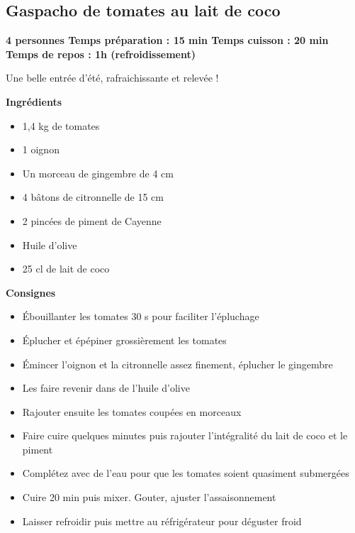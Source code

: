 \documentclass[]{book}
\providecommand{\tightlist}{%
  \setlength{\itemsep}{0pt}\setlength{\parskip}{0pt}}
\begin{document}
\subsection*{\texorpdfstring{{Gaspacho de tomates au lait de
coco}}{Gaspacho de tomates au lait de coco}}\label{gaspacho-de-tomates-au-lait-de-coco}

\begin{salebox}
\textbf{4 personnes \textbar{} Temps préparation : 15 min \textbar{}
Temps cuisson : 20 min \textbar{} Temps de repos : 1h (refroidissement)}

Une belle entrée d'été, rafraichissante et relevée !
\end{salebox}

 \textbf{Ingrédients}

\begin{itemize}
\tightlist
\item
  1,4 kg de tomates
\item
  1 oignon
\item
  Un morceau de gingembre de 4 cm
\item
  4 bâtons de citronnelle de 15 cm
\item
  2 pincées de piment de Cayenne
\item
  Huile d'olive
\item
  25 cl de lait de coco
\end{itemize}

\textbf{Consignes}

\begin{itemize}
\tightlist
\item
  Ébouillanter les tomates 30 s pour faciliter l'épluchage
\item
  Éplucher et épépiner grossièrement les tomates
\item
  Émincer l'oignon et la citronnelle assez finement, éplucher le
  gingembre
\item
  Les faire revenir dans de l'huile d'olive
\item
  Rajouter ensuite les tomates coupées en morceaux
\item
  Faire cuire quelques minutes puis rajouter l'intégralité du lait de
  coco et le piment
\item
  Complétez avec de l'eau pour que les tomates soient quasiment
  submergées
\item
  Cuire 20 min puis mixer. Gouter, ajuster l'assaisonnement
\item
  Laisser refroidir puis mettre au réfrigérateur pour déguster froid
\end{itemize}
\end{document}
